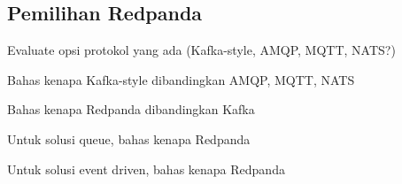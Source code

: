 \subsection{Pemilihan Redpanda}

Evaluate opsi protokol yang ada (Kafka-style, AMQP, MQTT, NATS?)

Bahas kenapa Kafka-style dibandingkan AMQP, MQTT, NATS

Bahas kenapa Redpanda dibandingkan Kafka

Untuk solusi queue, bahas kenapa Redpanda

Untuk solusi event driven, bahas kenapa Redpanda
